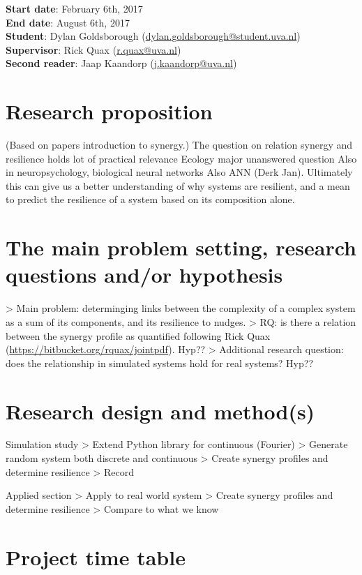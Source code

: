 \documentclass[11pt]{article}
\begin{document}
\noindent
\textbf{Start date}: February 6th, 2017\\
\textbf{End date}: August 6th, 2017\\
\textbf{Student}: Dylan Goldsborough (\url{dylan.goldsborough@student.uva.nl})\\
\textbf{Supervisor}: Rick Quax (\url{r.quax@uva.nl})\\
\textbf{Second reader}: Jaap Kaandorp (\url{j.kaandorp@uva.nl})\\

\section{Research proposition}

(Based on papers introduction to synergy.)
The question on relation synergy and resilience holds lot of practical relevance
Ecology major unanswered question
Also in neuropsychology, biological neural networks
Also ANN (Derk Jan).
Ultimately this can give us a better understanding of why systems are resilient, and a mean to predict the resilience of a system based on its composition alone.

\section{The main problem setting, research questions and/or hypothesis}

> Main problem: determinging links between the complexity of a complex system as a sum of its components, and its resilience to nudges. 
> RQ: is there a relation between the synergy profile as quantified following Rick Quax (\url{https://bitbucket.org/rquax/jointpdf}).
Hyp??
> Additional research question: does the relationship in simulated systems hold for real systems?
Hyp??

\section{Research design and method(s)}

Simulation study
> Extend Python library for continuous (Fourier)
> Generate random system both discrete and continuous
> Create synergy profiles and determine resilience
> Record

Applied section
> Apply to real world system
> Create synergy profiles and determine resilience
> Compare to what we know

\section{Project time table}
\end{document}
